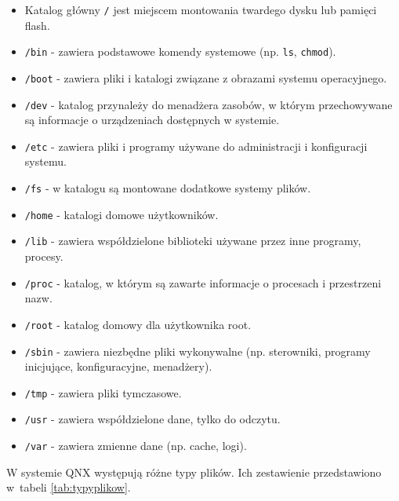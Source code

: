 \documentclass[11pt,twoside,a4paper]{article}
\newenvironment{myitemize}
{ \begin{itemize}
    \setlength{\itemsep}{0pt}
    \setlength{\parskip}{0pt}
    \setlength{\parsep}{0pt}     }
{ \end{itemize}                  }
\begin{document}
\begin{myitemize}
\item Katalog główny \lstinline{/} jest miejscem montowania twardego dysku lub pamięci flash.  
\item \lstinline{/bin} - zawiera podstawowe komendy systemowe (np. \lstinline{ls}, \lstinline{chmod}). 
\item \lstinline{/boot} - zawiera pliki i katalogi związane z obrazami systemu operacyjnego.
\item \lstinline{/dev} - katalog przynależy do menadżera zasobów, w którym przechowywane są informacje o urządzeniach dostępnych w systemie. 
\item \lstinline{/etc} - zawiera pliki i programy używane do administracji i konfiguracji systemu.
\item \lstinline{/fs} - w katalogu są montowane dodatkowe systemy plików.
\item \lstinline{/home} - katalogi domowe użytkowników.
\item \lstinline{/lib} - zawiera współdzielone biblioteki używane przez inne programy, procesy. 
\item \lstinline{/proc} - katalog, w którym są zawarte informacje o procesach i przestrzeni nazw. 
\item \lstinline{/root} - katalog domowy dla użytkownika root.
\item \lstinline{/sbin} - zawiera niezbędne pliki wykonywalne (np. sterowniki, programy inicjujące, konfiguracyjne, menadżery).
\item \lstinline{/tmp} - zawiera pliki tymczasowe.
\item \lstinline{/usr} - zawiera współdzielone dane, tylko do odczytu.
\item \lstinline{/var} - zawiera zmienne dane (np. cache, logi). 
\end{myitemize}

W systemie QNX występują różne typy plików. Ich zestawienie przedstawiono w~tabeli \ref{tab:typyplikow}. 
\end{document}
